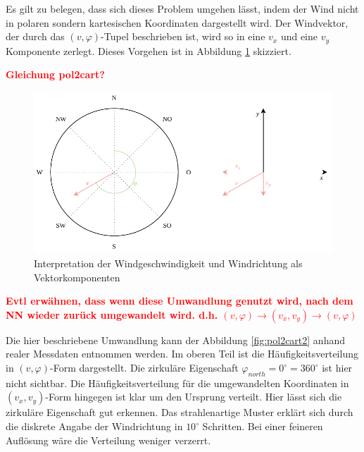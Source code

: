 \documentclass[
12pt, %
toc=listofnumbered, %
toc=chapterentrydotfill, %
numbers=noenddot, %
captions=tableheading, %
bibliography=numbered
]{scrreprt}
\newcommand{\highlight}[1]{\textbf{\textcolor{red}{#1}}}
\begin{document}
Es gilt zu belegen, dass sich dieses Problem umgehen lässt, indem der Wind nicht in polaren sondern kartesischen Koordinaten dargestellt wird. Der Windvektor, der durch das $(v,\varphi)$-Tupel beschrieben ist, wird so in eine $v_x$ und eine $v_y$ Komponente zerlegt. Dieses Vorgehen ist in Abbildung \ref{fig:pol2cart} skizziert.

\highlight{Gleichung pol2cart?}

\begin{figure}[tph]
	\begin{center}
		\includegraphics[scale = 1]{./images/pol2cart.pdf}
		\caption{Interpretation der Windgeschwindigkeit und Windrichtung als Vektorkomponenten}
		\label{fig:pol2cart}
	\end{center}
\end{figure}

\highlight{Evtl erwähnen, dass wenn diese Umwandlung genutzt wird, nach dem NN wieder zurück umgewandelt wird. d.h. $(v,\varphi) \rightarrow (v_x,v_y) \rightarrow(v,\varphi)$}

Die hier beschriebene Umwandlung kann der Abbildung \ref{fig:pol2cart2} anhand realer Messdaten entnommen werden. Im oberen Teil ist die Häufigkeitsverteilung in $(v,\varphi)$-Form dargestellt. Die zirkuläre Eigenschaft $\varphi_{north} = 0^\circ = 360^\circ$ ist hier nicht sichtbar. Die Häufigkeitsverteilung für die umgewandelten Koordinaten in $(v_x,v_y)$-Form hingegen ist klar um den Ursprung verteilt. Hier lässt sich die zirkuläre Eigenschaft gut erkennen. Das strahlenartige Muster erklärt sich durch die diskrete Angabe der Windrichtung in $10^\circ$ Schritten. Bei einer feineren Auflösung wäre die Verteilung weniger verzerrt.
\end{document}
